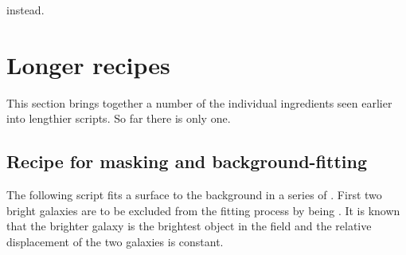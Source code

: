\documentclass[twoside,11pt,nolof]{starlink}
\providecommand{\NDFrefa}[1]{\xref{#1}{sun33}{}}
\begin{document}
\begin{small}
\begin{terminalv}
\end{terminalv}
\end{small}
instead.

\newpage
\section{Longer recipes
\label{sc4_se_long_recipes}}

This section brings together a number of the individual ingredients
seen earlier into lengthier scripts.  So far there is only one.

\subsection{Recipe for masking and background-fitting
\label{sc4_se_long1}}

The following script fits a surface to the background in a series of
\NDFrefa{\textsf{NDF}s}.
First two bright galaxies are to be excluded from the fitting process by
being .  It is known that the brighter
galaxy is the brightest object in the field and the relative
displacement of the two galaxies is constant.
\end{document}
